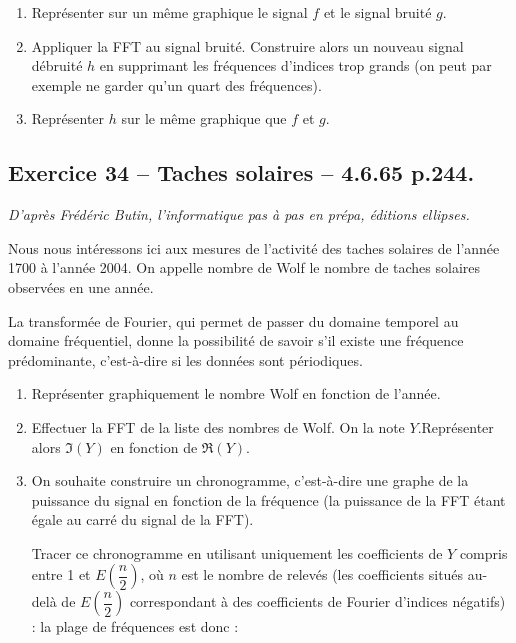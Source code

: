 \documentclass[10pt,fleqn]{article} %
\begin{document}
\begin{multicols}{2}
\begin{enumerate}
\item Représenter sur un même graphique le signal $f$ et le signal bruité $g$.
\item Appliquer la FFT au signal bruité. Construire alors un nouveau signal débruité $h$ en supprimant les fréquences d'indices trop grands (on peut par exemple ne garder qu'un quart des fréquences).
\item Représenter $h$ sur le même graphique que $f$ et $g$.
\end{enumerate}

\subsection*{Exercice 34 -- Taches solaires -- 4.6.65 p.244.}
\begin{flushright}
\textit{D'après Frédéric Butin, l'informatique pas à pas en prépa, éditions ellipses.}
\end{flushright}
Nous nous intéressons ici aux mesures de l'activité des taches solaires de l'année 1700 à l'année 2004. On appelle nombre de Wolf le nombre de taches solaires observées en une année. %

La transformée de Fourier, qui permet de passer du domaine temporel au domaine fréquentiel, donne la possibilité de savoir s'il existe une fréquence prédominante, c'est-à-dire si les données sont périodiques.

\begin{enumerate}
\item Représenter graphiquement le nombre Wolf en fonction de l'année. 
\item Effectuer la FFT de la liste des nombres de Wolf. On la note $Y$.Représenter alors $\mathfrak{I}\left(Y\right)$ en fonction de $\mathfrak{R}\left(Y\right)$.
\item On souhaite construire un chronogramme, c'est-à-dire une graphe de la puissance du signal en fonction de la fréquence (la puissance de la FFT étant égale au carré du signal de la FFT). 

Tracer ce chronogramme en utilisant uniquement les coefficients de $Y$ compris entre 1 et $E\left(\dfrac{n}{2}\right)$, où $n$ est le nombre de relevés (les coefficients situés au-delà de $E\left(\dfrac{n}{2}\right)$ correspondant à des coefficients de Fourier d'indices négatifs) : la plage de fréquences est donc :


\end{enumerate}
\end{multicols}
\end{document}
